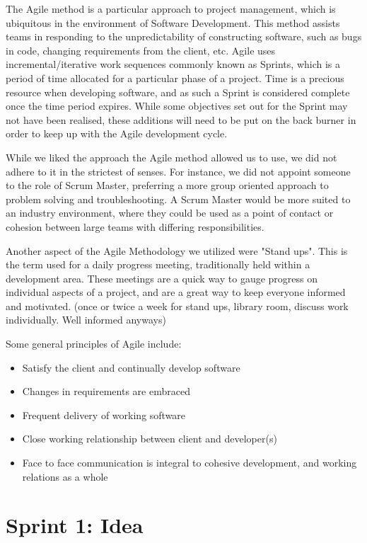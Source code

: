 The Agile method is a particular approach to project management, which is ubiquitous in the environment of Software Development. This method assists teams in responding to the unpredictability of constructing software, such as bugs in code, changing requirements from the client, etc. Agile uses incremental/iterative work sequences commonly known as Sprints, which is a period of time allocated for a particular phase of a project. Time is a precious resource when developing software, and as such a Sprint is considered complete once the time period expires. While some objectives set out for the Sprint may not have been realised, these additions will need to be put on the back burner in order to keep up with the Agile development cycle.

While we liked the approach the Agile method allowed us to use, we did not adhere to it in the strictest of senses. For instance, we did not appoint someone to the role of Scrum Master, preferring a more group oriented approach to problem solving and troubleshooting. A Scrum Master would be more suited to an industry environment, where they could be used as a point of contact or cohesion between large teams with differing responsibilities.

Another aspect of the Agile Methodology we utilized were "Stand ups". This is the term used for a daily progress meeting, traditionally held within a development area. These meetings are a quick way to gauge progress on individual aspects of a project, and are a great way to keep everyone informed and motivated. (once or twice a week for stand ups, library room, discuss work individually. Well informed anyways)

Some general principles of Agile include:

\begin{itemize}
    \item{Satisfy the client and continually develop software}
    \item{Changes in requirements are embraced}
    \item{Frequent delivery of working software} 
    \item{Close working relationship between client and developer(s)}
    \item{Face to face communication is integral to cohesive development, and working relations as a whole}
\end{itemize}

\section{Sprint 1: Idea}
	
